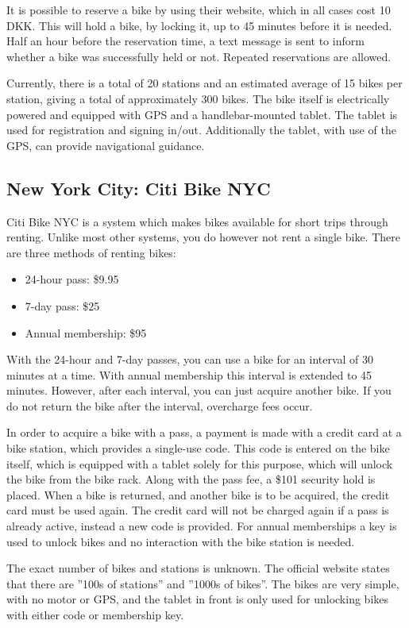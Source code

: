 It is possible to reserve a bike by using their website, which in all cases cost 10 DKK.
This will hold a bike, by locking it, up to 45 minutes before it is needed.
Half an hour before the reservation time, a text message is sent to inform whether a bike was successfully held or not.
Repeated reservations are allowed.

Currently, there is a total of 20 stations and an estimated average of 15 bikes per station, giving a total of approximately 300 bikes.
The bike itself is electrically powered and equipped with GPS and a handlebar-mounted tablet.
The tablet is used for registration and signing in/out.
Additionally the tablet, with use of the GPS, can provide navigational guidance.

\subsection{New York City: Citi Bike NYC}
Citi Bike NYC\cite{nyc_citibike} is a system which makes bikes available for short trips through renting.
Unlike most other systems, you do however not rent a single bike.
There are three methods of renting bikes:

\begin{itemize}
\item 24-hour pass: \$9.95
\item 7-day pass: \$25
\item Annual membership: \$95
\end{itemize}

With the 24-hour and 7-day passes, you can use a bike for an interval of 30 minutes at a time.
With annual membership this interval is extended to 45 minutes.
However, after each interval, you can just acquire another bike.
If you do not return the bike after the interval, overcharge fees occur.

In order to acquire a bike with a pass, a payment is made with a credit card at a bike station, which provides a single-use code.
This code is entered on the bike itself, which is equipped with a tablet solely for this purpose, which will unlock the bike from the bike rack.
Along with the pass fee, a \$101 security hold is placed.
When a bike is returned, and another bike is to be acquired, the credit card must be used again.
The credit card will not be charged again if a pass is already active, instead a new code is provided.
For annual memberships a key is used to unlock bikes and no interaction with the bike station is needed.

The exact number of bikes and stations is unknown.
The official website states that there are ''100s of stations'' and ''1000s of bikes''\cite{nyc_citibike}.
The bikes are very simple, with no motor or GPS, and the tablet in front is only used for unlocking bikes with either code or membership key.

